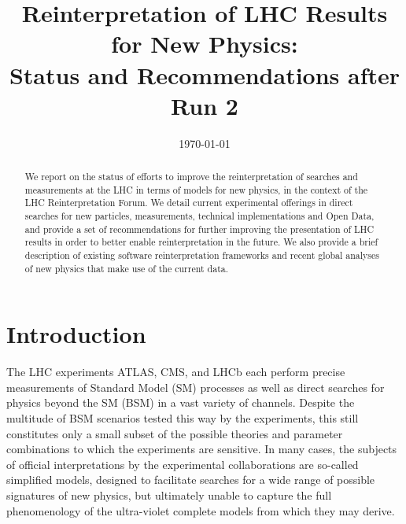 \documentclass[a4paper,aps,prd,longbibliography,notitlepage,showpacs,amsmath,amssymb,superscriptaddress,nofootinbib,floatfix,11pt,preprintnumbers]{revtex4-1-mod}
\begin{document}

\title{Reinterpretation of LHC Results for New Physics:\\ Status and Recommendations after Run 2}



\date{\today}

\begin{abstract}
We report on the status of efforts to improve the reinterpretation of searches and measurements at the LHC in terms of models for new physics, in the context of the LHC \mbox{Reinterpretation} Forum.  We detail current experimental offerings in direct searches for new particles, measurements, technical implementations and Open Data, and provide a set of recommendations for further improving the presentation of LHC results in order to better enable reinterpretation in the future.  We also provide a brief description of existing software reinterpretation frameworks and recent global analyses of new physics that make use of the current data.
\end{abstract}


\maketitle

\tableofcontents
\clearpage

\section{Introduction}\label{sec:intro}

The LHC experiments ATLAS, CMS, and LHCb each perform precise measurements of Standard Model (SM) processes as well as
direct searches for physics beyond the SM (BSM) in a vast variety of channels.
Despite the multitude of BSM scenarios tested this way by the experiments, this
still constitutes only a small subset of the possible theories and parameter combinations to which the experiments are sensitive. In many cases, the subjects of official interpretations by the experimental collaborations are so-called simplified models, designed to facilitate searches for a wide range of possible signatures of new physics, but ultimately unable to capture the full phenomenology of the ultra-violet complete models from which they may derive.
\end{document}
